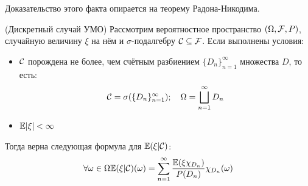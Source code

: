 \begin{note}
    Доказательство этого факта опирается на теорему Радона-Никодима.
\end{note}

\begin{lemma} (Дискретный случай УМО)
	Рассмотрим вероятностное пространство $(\Omega, \mathcal{F}, P)$, случайную величину $\xi$ на нём и $\sigma$-подалгебру $\mathcal{C} \subseteq \mathcal{F}$. Если выполнены условия:
	\begin{itemize}
		\item $\mathcal{C}$ порождена не более, чем счётным разбиением $\{D_n\}_{n = 1}^\infty$ множества $D$, то есть:
		\[
			\mathcal{C} = \sigma(\{D_n\}_{n = 1}^\infty);\quad \Omega = \bigsqcup_{n = 1}^\infty D_n
		\]
		
		\item $\mathbb{E} |\xi| < \infty$
	\end{itemize}
	Тогда верна следующая формула для $\mathbb{E}(\xi|\mathcal{C})$:
	\[
		\forall \omega \in \Omega \mathbb{E}(\xi|\mathcal{C})(\omega) = \sum_{n = 1}^\infty \frac{\mathbb{E}(\xi\chi_{D_n})}{P(D_n)} \chi_{D_n}(\omega)
	\]
\end{lemma}

